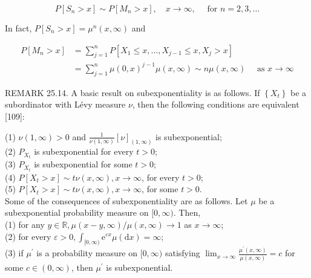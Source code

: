 \documentclass[a4paper,11pt]{article}
\begin{document}
$$
    P\left[S_{n}>x\right] \sim P\left[M_{n}>x\right], \quad x \rightarrow \infty, \quad \text { for } n=2,3, \ldots
$$

In fact, $P\left[S_{n}>x\right]=\mu^{n}(x, \infty)$ and

$$
    \begin{aligned}
        P\left[M_{n}>x\right] & =\sum_{j=1}^{n} P\left[X_{1} \leq x, \ldots, X_{j-1} \leq x, X_{j}>x\right]                                  \\
                              & =\sum_{j=1}^{n} \mu(0, x)^{j-1} \mu(x, \infty) \sim n \mu(x, \infty) \quad \text { as } x \rightarrow \infty
    \end{aligned}
$$

REMARK 25.14. A basic result on subexponentiality is as follows. If $\left\{X_{t}\right\}$
be a subordinator with Lévy measure $\nu$, then the following conditions are equivalent [109]:

(1) $\nu(1, \infty)>0$ and $\frac{1}{\nu(1, \infty)}[\nu]_{(1, \infty)}$ is subexponential; \\

(2) $P_{X_{t}}$ is subexponential for every $t>0$; \\

(3) $P_{X_{t}}$ is subexponential for some $t>0$; \\

(4) $P\left[X_{t}>x\right] \sim t \nu(x, \infty), x \rightarrow \infty$, for every $t>0$; \\

(5) $P\left[X_{t}>x\right] \sim t \nu(x, \infty), x \rightarrow \infty$, for some $t>0$. \\

Some of the consequences of subexponentiality are as follows. Let $\mu$ be a subexponential probability measure on $[0, \infty)$.
Then,\\

(1) for any $y \in \mathbb{R}, \mu(x-y, \infty) / \mu(x, \infty) \rightarrow 1$ as $x \rightarrow \infty$; \\

(2) for every $\varepsilon>0, \int_{[0, \infty)} \mathrm{e}^{\varepsilon x} \mu(\mathrm{d} x)=\infty$; \\

(3) if $\mu^{\prime}$ is a probability measure on $[0, \infty)$ satisfying $\lim _{x \rightarrow \infty}
    \frac{\mu^{\prime}(x, \infty)}{\mu(x, \infty)}=c$ for some $c \in(0, \infty)$, then $\mu^{\prime}$ is subexponential. \\
\end{document}
